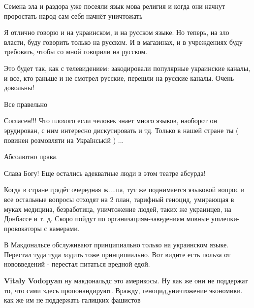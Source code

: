\begin{itemize}
Семена зла и раздора уже посеяли язык мова религия и когда они начнут проростать народ сам себя начнёт уничтожать


Я отлично говорю и на украинском, и на русском языке. Но теперь, на зло власти,
буду говорить только на русском. И в магазинах, и в учреждениях буду требовать,
чтобы со мной говорили на русском.

Это будет так, как с телевидением: закодировали популярные украинские каналы, и
все, кто раньше и не смотрел русские, перешли на русские каналы. Очень
довольны!

Все правельно

Согласен!!! Что плохого если человек знает много языков, наоборот он
эрудирован, с ним интересно дискутировать и тд.  Только в нашей стране ты (
повинен розмовляти на Українській ) ...

Абсолютно права.

Слава Богу! Еще остались адекватные люди в этом театре абсурда!


Когда в стране грядёт очередная ж....па, тут же поднимается языковой вопрос и
все остальные вопросы отходят на 2 план, тарифный геноцид, умирающая в муках
медицина, безработица, уничтожение людей, таких же украинцев, на Донбассе и т.
д. Скоро пойдут по организациям-заведениям мовные ушлепки-провокаторы с
камерами.


В Макдональсе обслуживают принципиально только на украинском языке. Перестал
туда туда ходить тоже принципиально.  Вот видите есть польза от нововведений -
перестал питаться вредной едой. \Laughey[1.0][white]

\begin{itemize}
\textbf{Vitaly Vodopyan} ну макдональдс это америкосы. Ну как же они не
поддержат то, что сами здесь пропонандируют. Вражду, геноцид,уничтожение
экономики. как же им не поддержать галицких фашистов
\end{itemize}


\end{itemize}
